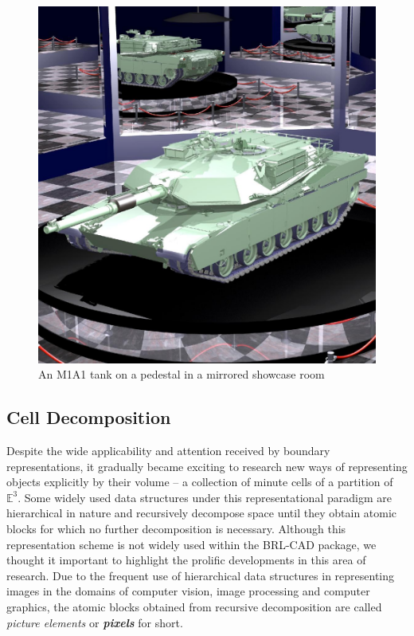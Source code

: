 \begin{figure}[htbp]
\centering
\includegraphics[trim=0.0cm 0.5cm 0.1cm 0.1cm, clip=true, totalheight=0.5\textheight]{Pictures/M1A1.png}
\caption[An M1A1 tank on a pedestal in a mirrored showcase room]{An M1A1 tank on a pedestal in a mirrored showcase room}
\label{M1A1}
\end{figure}  

\subsection{Cell Decomposition}

\hspace{30} Despite   the   wide   applicability   and   attention   received   by   boundary  
representations,   it   gradually   became   exciting   to   research   new   ways   of  
representing   objects   explicitly   by   their   volume   –   a   collection   of   minute   cells   of   a  
partition   of   $\mathbb{E}^3 $.   Some   widely   used   data   structures   under  
this   representational   paradigm   are   hierarchical   in   nature   and   recursively  
decompose   space   until   they   obtain   atomic   blocks   for   which   no   further  
 decomposition   is   necessary.   Although   this   representation   scheme   is   not   widely  
used   within   the   BRL-­CAD   package,   we   thought   it   important   to   highlight   the   prolific  
developments   in   this   area   of   research.   Due   to   the   frequent   use   of   hierarchical  
data   structures   in   representing   images   in   the   domains   of   computer   vision,  
image   processing   and   computer   graphics,   the   atomic   blocks   obtained   from  
recursive decomposition are called \textit{picture elements} or \textbf{\textit{pixels}} for short. 

